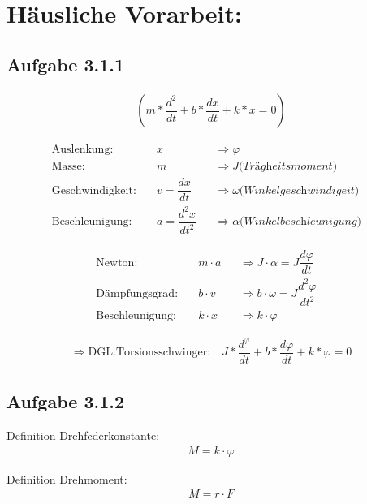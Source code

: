 \documentclass[a4paper]{scrartcl}
\def\header#1#2{
  \begin{center}
    {\Large #1}\\
    {#2}
  \end{center}
}
\begin{document}
\header{\HEADDING}{\SUBHEADDING}

\tableofcontents

\section{Häusliche Vorarbeit:}
\subsection{Aufgabe 3.1.1}

\begin{align}
(m*\dfrac{d^2}{dt} + b*\dfrac{dx}{dt} + k*x = 0)
\end{align}

\begin{align*}
 \text{Auslenkung:}& \quad x 
 	&&\Rightarrow \varphi \\
 \text{Masse:}& \quad m 
 	&&\Rightarrow J \textit{(Trägheitsmoment)} &\\
 \text{Geschwindigkeit:}& \quad v=\dfrac{dx}{dt} 
 	&&\Rightarrow \omega \textit{(Winkelgeschwindigeit)}&\\
 \text{Beschleunigung:}& \quad a=\dfrac{d^2x}{dt^2} 
 	&&\Rightarrow \alpha \textit{(Winkelbeschleunigung)}&
\end{align*}

\begin{align*}
 \text{Newton:}& \quad m \cdot a 
 	&&\Rightarrow J \cdot \alpha = J \dfrac{d\varphi}{dt} &\\
 \text{Dämpfungsgrad:}& \quad b \cdot v 
 	&&\Rightarrow b \cdot \omega = J \dfrac{d^2\varphi}{dt^2} &\\
 \text{Beschleunigung:}& \quad k \cdot x 
 	&&\Rightarrow k \cdot \varphi &
\end{align*}

\begin{align}
\Rightarrow \text{DGL.Torsionsschwinger:} \quad J*\dfrac{d^\varphi}{dt} + b*\dfrac{d\varphi}{dt} + k*\varphi = 0
\end{align}

\subsection{Aufgabe 3.1.2}

Definition Drehfederkonstante:
\begin{align}
M = k \cdot \varphi
\end{align}

Definition Drehmoment:
\begin{align}
M = r \cdot F
\end{align}
\end{document}
